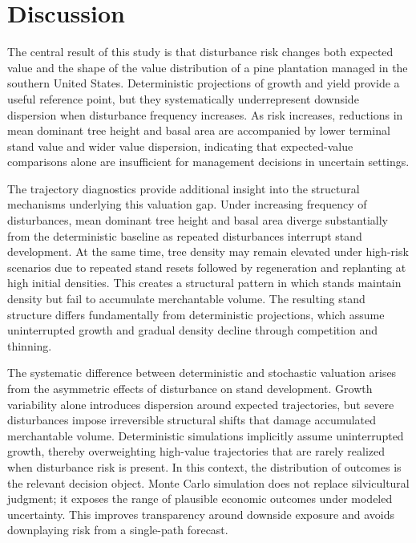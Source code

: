 \documentclass[12pt]{report}
\begin{document}
\chapter{Discussion}
The central result of this study is that disturbance risk changes both expected value and the shape of the value 
distribution of a pine plantation managed in the southern United States. Deterministic projections of growth and yield provide a useful reference point, but they systematically underrepresent 
downside dispersion when disturbance frequency increases. As risk increases, reductions in mean dominant tree height and basal 
area are accompanied by lower terminal stand value and wider value dispersion, indicating that expected-value 
comparisons alone are insufficient for management decisions in uncertain settings.

The trajectory diagnostics provide additional insight into the structural mechanisms underlying this valuation gap. 
Under increasing frequency of disturbances, mean dominant tree height and basal area diverge substantially from the deterministic 
baseline as repeated disturbances interrupt stand development. At the same time, tree density may remain elevated 
under high-risk scenarios due to repeated stand resets followed by regeneration and replanting at high initial densities. This creates 
a structural pattern in which stands maintain density but fail to accumulate merchantable volume. The resulting stand 
structure differs fundamentally from deterministic projections, which assume uninterrupted growth and gradual density 
decline through competition and thinning.

The systematic difference between deterministic and stochastic valuation arises from the asymmetric effects of disturbance on stand development. 
Growth variability alone introduces dispersion around expected trajectories, but severe disturbances impose irreversible structural shifts that 
damage accumulated merchantable volume. Deterministic simulations implicitly assume uninterrupted growth, thereby overweighting high-value trajectories that 
are rarely realized when disturbance risk is present. In this context, the distribution of outcomes is the relevant decision object. Monte Carlo simulation does not replace silvicultural judgment; it exposes the range of plausible economic outcomes under modeled uncertainty. This improves 
transparency around downside exposure and avoids downplaying risk from a single-path forecast.
\end{document}
